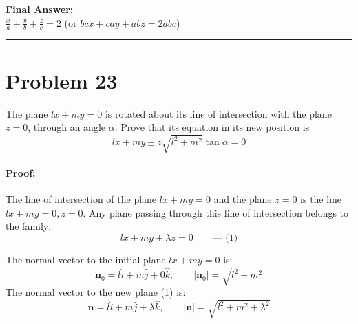 \documentclass[11pt,a4paper]{article}
\begin{document}
\begin{resultbox}
\textbf{Final Answer:}\\
$\boxed{\frac{x}{a} + \frac{y}{b} + \frac{z}{c} = 2}$ \quad (or $bc x + ca y + ab z = 2abc$)
\end{resultbox}

\vspace{0.4cm}
\hrule
\vspace{0.4cm}

\section{Problem 23}
\begin{problembox}[Problem 23]
The plane $lx + my = 0$ is rotated about its line of intersection with the plane $z = 0$, through an angle $\alpha$. Prove that its equation in its new position is
$$lx + my \pm z\sqrt{l^2 + m^2}\tan\alpha = 0$$
\end{problembox}

\paragraph{Proof:}
The line of intersection of the plane $lx + my = 0$ and the plane $z = 0$ is the line $lx + my = 0, z = 0$.
Any plane passing through this line of intersection belongs to the family:
$$lx + my + \lambda z = 0 \qquad \text{--- (1)}$$

The normal vector to the initial plane $lx + my = 0$ is:
$$\mathbf{n}_0 = l\hat{i} + m\hat{j} + 0\hat{k}, \qquad |\mathbf{n}_0| = \sqrt{l^2 + m^2}$$
The normal vector to the new plane (1) is:
$$\mathbf{n} = l\hat{i} + m\hat{j} + \lambda\hat{k}, \qquad |\mathbf{n}| = \sqrt{l^2 + m^2 + \lambda^2}$$
\end{document}
